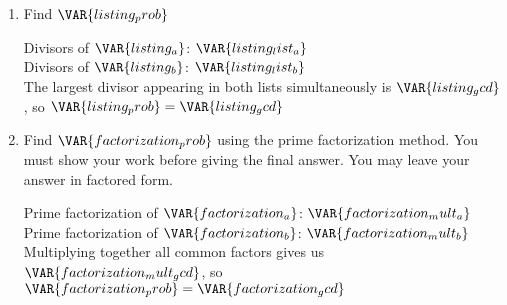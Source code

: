
\begin{enumerate}

    \item Find $\VAR{listing_prob}$ 

    \vfill

    \begin{ansenv}
        Divisors of $\VAR{listing_a}$: $\VAR{listing_list_a}$\\

        Divisors of $\VAR{listing_b}$: $\VAR{listing_list_b}$\\

        The largest divisor appearing in both lists simultaneously is $\VAR{listing_gcd}$, so $\VAR{listing_prob} = \VAR{listing_gcd}$
    \end{ansenv}

    \vfill

    \item Find $\VAR{factorization_prob}$ using the prime factorization method. You must show your work before giving the final answer. You may leave your answer in factored form.

    \vfill

    \begin{ansenv}
        Prime factorization of $\VAR{factorization_a}$: $\VAR{factorization_mult_a}$\\

        Prime factorization of $\VAR{factorization_b}$: $\VAR{factorization_mult_b}$\\

        Multiplying together all common factors gives us $\VAR{factorization_mult_gcd}$, so $\VAR{factorization_prob} = \VAR{factorization_gcd}$
    \end{ansenv}

    \vfill

\end{enumerate}

\trueemptypage